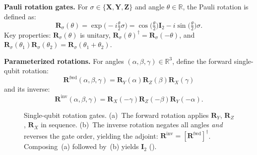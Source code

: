\documentclass[11pt]{article}
\newcommand{\bbR}{\mathbb{R}}
\theoremstyle{plain}
\theoremstyle{plain}
\begin{document}
\medskip\noindent\textbf{Pauli rotation gates.}
For $\sigma\in\{\mathbf{X},\mathbf{Y},\mathbf{Z}\}$ and angle $\theta\in\bbR$, the Pauli
rotation is defined as:
\begin{equation}\label{eq:pauli_rot}
  \mathbf{R}_{\sigma}(\theta)
  = \exp \bigl(-i\tfrac{\theta}{2}\sigma\bigr)
  = \cos \bigl(\tfrac{\theta}{2}\bigr) \mathbf{I}_2
    - i\sin \bigl(\tfrac{\theta}{2}\bigr) \sigma.
\end{equation}
Key properties: $\mathbf{R}_{\sigma}(\theta)$ is unitary,
$\mathbf{R}_{\sigma}(\theta)^{\dagger}=\mathbf{R}_{\sigma}(-\theta)$, and
$\mathbf{R}_{\sigma}(\theta_1)\mathbf{R}_{\sigma}(\theta_2)
=\mathbf{R}_{\sigma}(\theta_1+\theta_2)$.

\medskip\noindent\textbf{Parameterized rotations.}
For angles $(\alpha,\beta,\gamma)\in\bbR^3$, define the forward
single-qubit rotation:
\begin{equation}\label{eq:fwd_rot}
  \mathbf{R}^{\mathrm{fwd}}(\alpha,\beta,\gamma)
  = \mathbf{R}_Y(\alpha) \mathbf{R}_Z(\beta) \mathbf{R}_X(\gamma)
\end{equation}
and its inverse:
\begin{equation}\label{eq:inv_rot}
  \mathbf{R}^{\mathrm{inv}}(\alpha,\beta,\gamma)
  = \mathbf{R}_X(-\gamma) \mathbf{R}_Z(-\beta) \mathbf{R}_Y(-\alpha).
\end{equation}
\begin{figure}[t]
\centering
{}
\hspace{1.2cm}
\caption{Single-qubit rotation gates.  (a)~The forward rotation
applies $\mathbf{R}_Y$, $\mathbf{R}_Z$, $\mathbf{R}_X$ in sequence.  (b)~The inverse rotation
negates all angles \emph{and} reverses the gate order, yielding the
adjoint: $\mathbf{R}^{\mathrm{inv}}=[\mathbf{R}^{\mathrm{fwd}}]^{\dagger}$.
Composing~(a) followed by~(b) yields $\mathbf{I}_2$
().}
\label{fig:single_rotations}
\end{figure}
\end{document}
